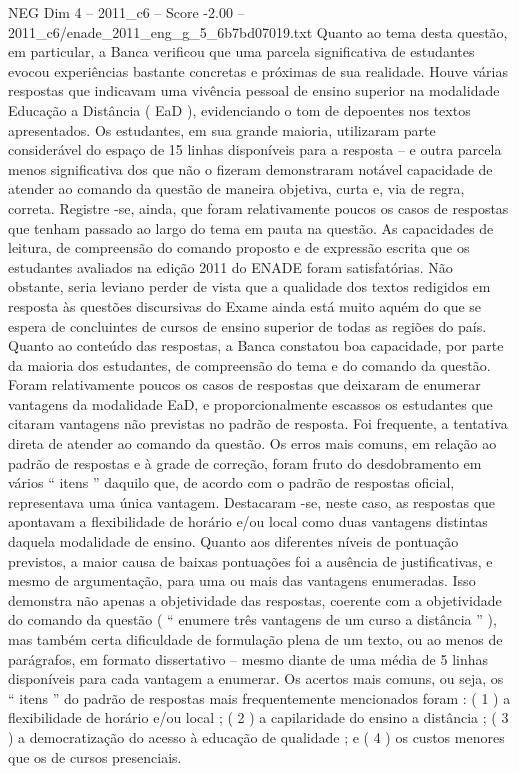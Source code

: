 \begin{textsample}{NEG Dim 4 – 2011\_c6 – Score -2.00 – 2011\_c6/enade\_2011\_eng\_g\_5\_6b7bd07019.txt}
Quanto ao tema desta questão, em particular, a Banca verificou que uma parcela significativa de estudantes evocou experiências bastante concretas e próximas de sua realidade.
Houve várias respostas que indicavam uma vivência pessoal de ensino superior na modalidade Educação a Distância ( EaD ), evidenciando o tom de depoentes nos textos apresentados.
Os estudantes, em sua grande maioria, utilizaram parte considerável do espaço de 15 linhas disponíveis para a resposta – e outra parcela menos significativa dos que não o fizeram demonstraram notável capacidade de atender ao comando da questão de maneira objetiva, curta e, via de regra, correta.
Registre -se, ainda, que foram relativamente poucos os casos de respostas que tenham passado ao largo do tema em pauta na questão.
As capacidades de leitura, de compreensão do comando proposto e de expressão escrita que os estudantes avaliados na edição 2011 do ENADE foram satisfatórias.
Não obstante, seria leviano perder de vista que a qualidade dos textos redigidos em resposta às questões discursivas do Exame ainda está muito aquém do que se espera de concluintes de cursos de ensino superior de todas as regiões do país.
Quanto ao conteúdo das respostas, a Banca constatou boa capacidade, por parte da maioria dos estudantes, de compreensão do tema e do comando da questão.
Foram relativamente poucos os casos de respostas que deixaram de enumerar vantagens da modalidade EaD, e proporcionalmente escassos os estudantes que citaram vantagens não previstas no padrão de resposta.
Foi frequente, a tentativa direta de atender ao comando da questão.
Os erros mais comuns, em relação ao padrão de respostas e à grade de correção, foram fruto do desdobramento em vários “ itens ” daquilo que, de acordo com o padrão de respostas oficial, representava uma única vantagem.
Destacaram -se, neste caso, as respostas que apontavam a flexibilidade de horário e/ou local como duas vantagens distintas daquela modalidade de ensino.
Quanto aos diferentes níveis de pontuação previstos, a maior causa de baixas pontuações foi a ausência de justificativas, e mesmo de argumentação, para uma ou mais das vantagens enumeradas.
Isso demonstra não apenas a objetividade das respostas, coerente com a objetividade do comando da questão ( “ enumere três vantagens de um curso a distância ” ), mas também certa dificuldade de formulação plena de um texto, ou ao menos de parágrafos, em formato dissertativo – mesmo diante de uma média de 5 linhas disponíveis para cada vantagem a enumerar.
Os acertos mais comuns, ou seja, os “ itens ” do padrão de respostas mais frequentemente mencionados foram : ( 1 ) a flexibilidade de horário e/ou local ; ( 2 ) a capilaridade do ensino a distância ; ( 3 ) a democratização do acesso à educação de qualidade ; e ( 4 ) os custos menores que os de cursos presenciais.

\end{textsample}
